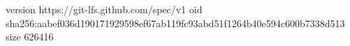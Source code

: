 version https://git-lfs.github.com/spec/v1
oid sha256:aabef036d190171929598ef67ab119fc93abd51f1264b40e594c600b7338d513
size 626416
